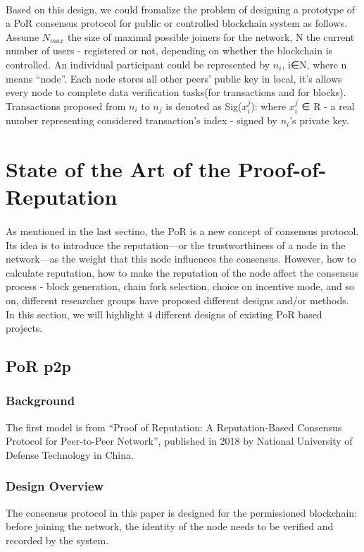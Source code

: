 \documentclass[doublespacing]{bmcart}
\begin{document}
\begin{CJK*}{UTF8}{gbsn}
\paragraph{} Based on this design, we could fromalize the problem of designing a prototype of a PoR consensus protocol for public or controlled blockchain system as follows. Assume $N_{max}$ the size of maximal possible joiners for the network, N the current number of users - registered or not, depending on whether the blockchain is controlled. An individual participant could be represented by $n_i$, i∈N, where n means ``node''. Each node stores all other peers' public key in local, it's allows every node to complete data verification tasks(for transactions and for blocks). Transactions proposed from $n_i$ to $n_j$ is denoted as
Sig($x_i^j$): where $x_i^j$ ∈ R - a real number representing considered transaction's index - signed by $n_i$'s private key. 

\section{State of the Art of the Proof-of-Reputation}
	\paragraph{} 
	As mentioned in the last sectino, the PoR is a new concept of consensus protocol. Its idea is to introduce the reputation—or the trustworthiness of a node in the network—as the weight that this node influences the consensus. However, how to calculate reputation, how to make the reputation of the node affect the consensus process - block generation, chain fork selection, choice on incentive mode, and so on, different researcher groups have proposed different designs and/or methods. In this section, we will highlight 4 different designs of existing PoR based projects.
	\subsection{PoR p2p} 
	\subsubsection*{Background} 
	The first model is from ``Proof of Reputation: A Reputation-Based Consensus Protocol for Peer-to-Peer Network'', published in 2018 by National University of Defense Technology in China. 
	\subsubsection*{Design Overview} 
	The consensus protocol in this paper is designed for the permissioned blockchain: before joining the network, the identity of the node needs to be verified and recorded by the system.

\end{CJK*}
\end{document}
